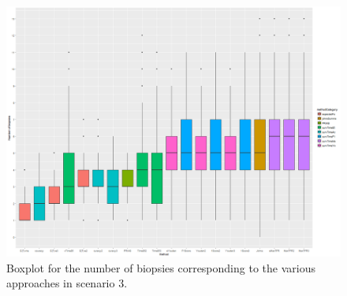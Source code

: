 \begin{figure}[H]
\centering
\captionsetup{justification=centering}
\includegraphics[width=\textwidth]{sim_study_res_sc_8pt5_sh_3/nb_boxplot.png}
\caption{\label{fig : sc_8pt5_sh_3_nb_boxplot} Boxplot for the number of biopsies corresponding to the various approaches in scenario 3.}
\end{figure}